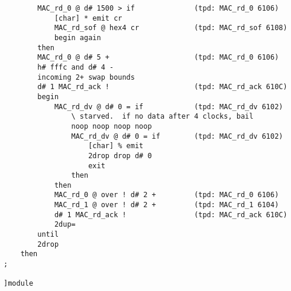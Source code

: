 \begin{verbatim}
        MAC_rd_0 @ d# 1500 > if              (tpd: MAC_rd_0 6106)
            [char] * emit cr
            MAC_rd_sof @ hex4 cr             (tpd: MAC_rd_sof 6108)
            begin again
        then
        MAC_rd_0 @ d# 5 +                    (tpd: MAC_rd_0 6106)
        h# fffc and d# 4 -
        incoming 2+ swap bounds
        d# 1 MAC_rd_ack !                    (tpd: MAC_rd_ack 610C)
        begin
            MAC_rd_dv @ d# 0 = if            (tpd: MAC_rd_dv 6102)
                \ starved.  if no data after 4 clocks, bail 
                noop noop noop noop
                MAC_rd_dv @ d# 0 = if        (tpd: MAC_rd_dv 6102)
                    [char] % emit
                    2drop drop d# 0
                    exit
                then
            then
            MAC_rd_0 @ over ! d# 2 +         (tpd: MAC_rd_0 6106)
            MAC_rd_1 @ over ! d# 2 +         (tpd: MAC_rd_1 6104)
            d# 1 MAC_rd_ack !                (tpd: MAC_rd_ack 610C)
            2dup=
        until
        2drop
    then
;

]module

\end{verbatim}
